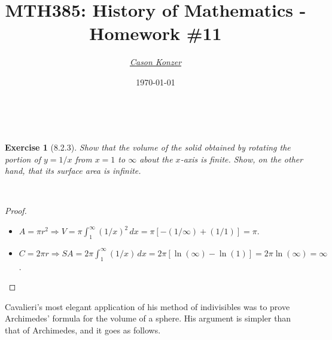 \documentclass[12pt]{article}
\newcommand{\XB}{\color{black}}
\newcommand{\XBB}{\color{blue}}
\newcommand{\XV}{\color{violet}}
\newcommand{\ds}{\displaystyle}
\theoremstyle{plain}
\newtheorem{ex}{Exercise}
\begin{document}
\title{\textbf{MTH385}: History of Mathematics - Homework \#11}
\date{\today}
\author{\XV\textit{\large{\href{https://github.com/casonk}{Cason Konzer}}}\XB}

\maketitle

\hrulefill

\newpage


\XBB\hrulefill\XB \\
\begin{ex} [8.2.3]
  Show that the volume of the solid obtained by rotating the portion of $ y = 1/x $ from $ x = 1 $ to $ \infty $ about the $ x $-axis is finite.
  Show, on the other hand, that its surface area is infinite.
\end{ex}
\XBB\hrulefill\XB \\

\begin{proof}
  \ \\

  \begin{itemize}
    \item $ \ds A = \pi r^{2} \Rightarrow V = \pi \int_{1}^{\infty} (1/x)^{2} \,dx = \pi[-(1/\infty) + (1/1) ]  = \pi  $.
    \item $ \ds C = 2 \pi r \Rightarrow SA = 2 \pi \int_{1}^{\infty} (1/x) \,dx = 2\pi[\ln(\infty) - \ln(1)] = 2\pi\ln(\infty) = \infty $.
  \end{itemize}

\end{proof}

\newpage

Cavalieri's most elegant application of his method of indivisibles was to prove Archimedes' formula for the volume of a sphere.
His argument is simpler than that of Archimedes, and it goes as follows.

\end{document}
